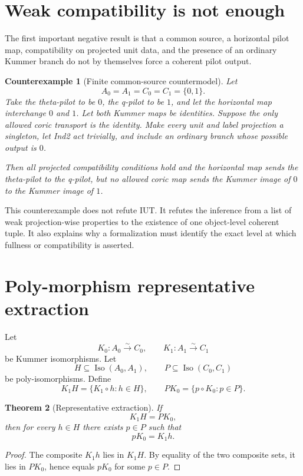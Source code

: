 \documentclass[11pt]{amsart}
\newtheorem{theorem}{Theorem}[section]
\newtheorem{counterexample}[theorem]{Counterexample}
\theoremstyle{definition}
\theoremstyle{remark}
\begin{document}
\section{Weak compatibility is not enough}

The first important negative result is that a common source, a horizontal
pilot map, compatibility on projected unit data, and the presence of an
ordinary Kummer branch do not by themselves force a coherent pilot output.

\begin{counterexample}[Finite common-source countermodel]\label{cex:weak}
Let
\[
 A_0=A_1=C_0=C_1=\{0,1\}.
\]
Take the theta-pilot to be $0$, the q-pilot to be $1$, and let the horizontal
map interchange $0$ and $1$.  Let both Kummer maps be identities.  Suppose
the only allowed coric transport is the identity.  Make every unit and label
projection a singleton, let Ind2 act trivially, and include an ordinary branch
whose possible output is $0$.

Then all projected compatibility conditions hold and the horizontal map sends
the theta-pilot to the q-pilot, but no allowed coric map sends the Kummer image
of $0$ to the Kummer image of $1$.
\end{counterexample}

This counterexample does not refute IUT.  It refutes the inference from a list
of weak projection-wise properties to the existence of one object-level
coherent tuple.  It also explains why a formalization must identify the exact
level at which fullness or compatibility is asserted.

\section{Poly-morphism representative extraction}

Let
\[
 K_0:A_0\overset\sim\longrightarrow C_0,
 \qquad
 K_1:A_1\overset\sim\longrightarrow C_1
\]
be Kummer isomorphisms.  Let
\[
 H\subseteq\operatorname{Iso}(A_0,A_1),
 \qquad
 P\subseteq\operatorname{Iso}(C_0,C_1)
\]
be poly-isomorphisms.  Define
\[
 K_1H=\{K_1\circ h:h\in H\},
 \qquad
 PK_0=\{p\circ K_0:p\in P\}.
\]

\begin{theorem}[Representative extraction]\label{thm:extract}
If
\[
 K_1H=PK_0,
\]
then for every $h\in H$ there exists $p\in P$ such that
\[
 pK_0=K_1h.
\]
\end{theorem}

\begin{proof}
The composite $K_1h$ lies in $K_1H$.  By equality of the two composite sets,
it lies in $PK_0$, hence equals $pK_0$ for some $p\in P$.
\end{proof}
\end{document}
